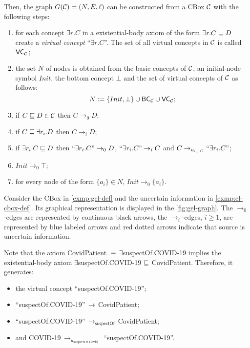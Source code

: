 Then, the graph $G(\mathcal{C}) = (N, E, \ell)$ can be constructed from a CBox $\mathcal{C}$ with the following steps:
\begin{enumerate}
	\item for each concept $\exists r.C$ in a existential-body axiom of the form $\exists r.C \sqsubseteq D$ create a \emph{virtual concept} ``$\exists r.C$''. The set of all virtual concepts in $\mathcal{C}$ is called $\textsf{VC}_{\mathcal{C}}$;
	\item the set $N$ of nodes is obtained from the basic concepts of $\mathcal{C}$, an initial-node symbol $Init$, the bottom concept $\bot$ and the set of virtual concepts of $\mathcal{C}$ as follows:
	\[ N := \{Init, \bot\} \cup \textsf{BC}_{\mathcal{C}} \cup \textsf{VC}_{\mathcal{C}}; \]
	\item if $C \sqsubseteq D \in \mathcal{C}$ then $C \to_0 D$; 
	\item if $C \sqsubseteq \exists r_i.D$ then $C \to_i D$;
	\item if $\exists r_i.C \sqsubseteq D$ then $\text{``}\exists r_i.C\text{''} \to_0 D$, $\text{``}\exists r_i.C\text{''} \to_i C$ and $C \to_{u_{r_i.C}} \text{``}\exists r_i.C\text{''}$; 
	\item $Init \to_0 \top$; 
	\item for every node of the form $\{a_i\} \in N$, $Init \to_0 \{a_i\}$.
\end{enumerate}

\begin{example}
	Consider the CBox in \autoref{exmp:gel-def} and the uncertain information in \autoref{exmp:el-cbox-def}. Its graphical representation is displayed in the \autoref{fig:gel-graph}. The $\to_0$-edges are represented by continuous black arrows, the $\to_i$-edges, $i \geq 1$, are represented by blue labeled arrows and red dotted arrows indicate that source is uncertain information.
	
	Note that the axiom \textsf{CovidPatient $\equiv\, \exists$suspectOf.COVID-19} implies the existential-body axiom \textsf{$\exists$suspectOf.COVID-19 $\sqsubseteq$ CovidPatient}. Therefore, it generates: 
	\begin{itemize}
		\item the virtual concept ``\textsf{suspectOf.COVID-19}'';
		\item \textsf{``suspectOf.COVID-19''$\,\to\,$CovidPatient};
		\item \textsf{``suspectOf.COVID-19''$\,\to_{\textsf{suspectOf}}\,$CovidPatient};
		\item and \textsf{COVID-19$\,\to_{u_{\text{suspectOf.Covid}}}\,$ ``suspectOf.COVID-19''}. 
	\end{itemize}
\end{example}

